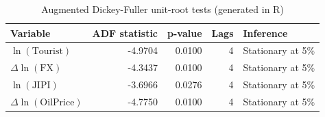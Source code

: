 \begin{table}[H]
\centering
\caption{Augmented Dickey-Fuller unit-root tests (generated in R)}
\begin{tabular}{lrrrl}
\toprule
Variable & ADF statistic & p-value & Lags & Inference \\
\midrule
$\ln(\text{Tourist})$ & -4.9704 & 0.0100 & 4 & Stationary at 5\% \\
$\Delta \ln(\text{FX})$ & -4.3437 & 0.0100 & 4 & Stationary at 5\% \\
$\ln(\text{JIPI})$ & -3.6966 & 0.0276 & 4 & Stationary at 5\% \\
$\Delta \ln(\text{OilPrice})$ & -4.7750 & 0.0100 & 4 & Stationary at 5\% \\
\bottomrule
\end{tabular}
\end{table}
